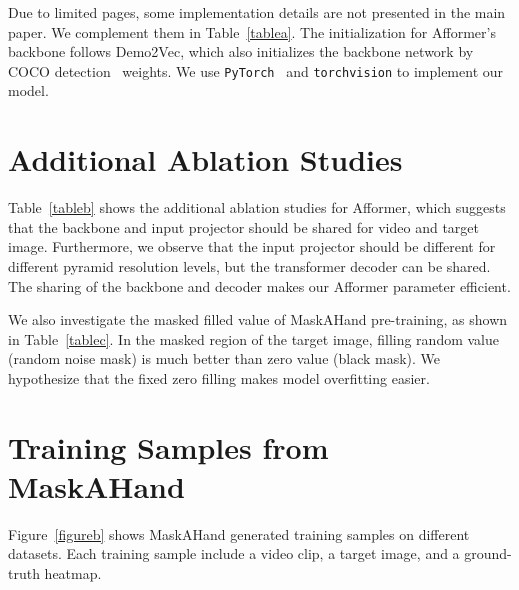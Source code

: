 \documentclass[10pt,twocolumn,letterpaper]{article}
\begin{document}
{Due to limited pages, some implementation details are not presented in the main paper. We complement them in Table~\ref{tablea}. The initialization for Afformer's backbone follows Demo2Vec\cite{demo2vec}, which also initializes the backbone network by COCO detection~\cite{coco} weights. We use \texttt{PyTorch}~\cite{pytorch} and \texttt{torchvision} to implement our model. 

\section{Additional Ablation Studies}\label{sectionc}

Table~\ref{tableb} shows the additional ablation studies for Afformer, which suggests that the backbone and input projector should be shared for video and target image. Furthermore, we observe that the input projector should be different for different pyramid resolution levels, but the transformer decoder can be shared. The sharing of the backbone and decoder makes our Afformer parameter efficient. 

We also investigate the masked filled value of MaskAHand pre-training, as shown in Table~\ref{tablec}. In the masked region of the target image, filling random value (\ie random noise mask) is much better than zero value (\ie black mask). We hypothesize that the fixed zero filling makes model overfitting easier.

\section{Training Samples from MaskAHand}\label{sectiond}

Figure~\ref{figureb} shows MaskAHand generated training samples on different datasets. Each training sample include a video clip, a target image, and a ground-truth heatmap.

}
\end{document}
